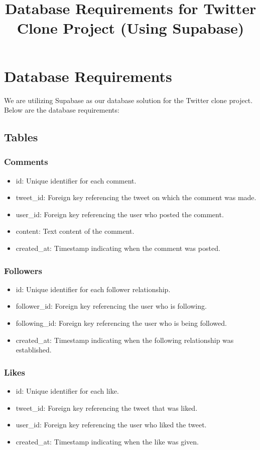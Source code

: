 \documentclass{article}
\title{Database Requirements for Twitter Clone Project (Using Supabase)}
\author{}
\date{}
\begin{document}
\maketitle

\section{Database Requirements}

We are utilizing Supabase as our database solution for the Twitter clone project. Below are the database requirements:

\subsection{Tables}

\subsubsection{Comments}
\begin{itemize}
    \item id: Unique identifier for each comment.
    \item tweet\_id: Foreign key referencing the tweet on which the comment was made.
    \item user\_id: Foreign key referencing the user who posted the comment.
    \item content: Text content of the comment.
    \item created\_at: Timestamp indicating when the comment was posted.
\end{itemize}

\subsubsection{Followers}
\begin{itemize}
    \item id: Unique identifier for each follower relationship.
    \item follower\_id: Foreign key referencing the user who is following.
    \item following\_id: Foreign key referencing the user who is being followed.
    \item created\_at: Timestamp indicating when the following relationship was established.
\end{itemize}

\subsubsection{Likes}
\begin{itemize}
    \item id: Unique identifier for each like.
    \item tweet\_id: Foreign key referencing the tweet that was liked.
    \item user\_id: Foreign key referencing the user who liked the tweet.
    \item created\_at: Timestamp indicating when the like was given.
\end{itemize}
\end{document}

